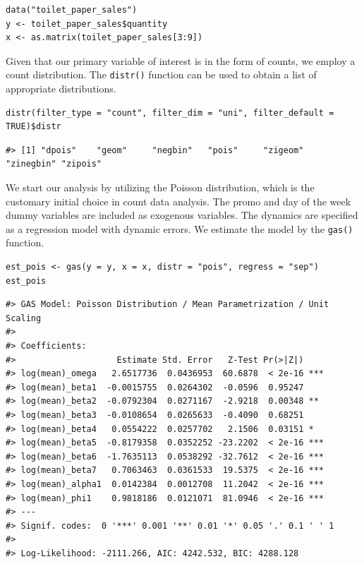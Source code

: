 \begin{verbatim}
data("toilet_paper_sales")
y <- toilet_paper_sales$quantity
x <- as.matrix(toilet_paper_sales[3:9])
\end{verbatim}

Given that our primary variable of interest is in the form of counts, we employ a count distribution. The \texttt{distr()} function can be used to obtain a list of appropriate distributions.

\begin{verbatim}
distr(filter_type = "count", filter_dim = "uni", filter_default = TRUE)$distr
\end{verbatim}

\begin{verbatim}
#> [1] "dpois"    "geom"     "negbin"   "pois"     "zigeom"   "zinegbin" "zipois"
\end{verbatim}

We start our analysis by utilizing the Poisson distribution, which is the customary initial choice in count data analysis. The promo and day of the week dummy variables are included as exogenous variables. The dynamics are specified as a regression model with dynamic errors. We estimate the model by the \texttt{gas()} function.

\begin{verbatim}
est_pois <- gas(y = y, x = x, distr = "pois", regress = "sep")
est_pois
\end{verbatim}

\begin{verbatim}
#> GAS Model: Poisson Distribution / Mean Parametrization / Unit Scaling 
#> 
#> Coefficients: 
#>                    Estimate Std. Error   Z-Test Pr(>|Z|)    
#> log(mean)_omega   2.6517736  0.0436953  60.6878  < 2e-16 ***
#> log(mean)_beta1  -0.0015755  0.0264302  -0.0596  0.95247    
#> log(mean)_beta2  -0.0792304  0.0271167  -2.9218  0.00348 ** 
#> log(mean)_beta3  -0.0108654  0.0265633  -0.4090  0.68251    
#> log(mean)_beta4   0.0554222  0.0257702   2.1506  0.03151 *  
#> log(mean)_beta5  -0.8179358  0.0352252 -23.2202  < 2e-16 ***
#> log(mean)_beta6  -1.7635113  0.0538292 -32.7612  < 2e-16 ***
#> log(mean)_beta7   0.7063463  0.0361533  19.5375  < 2e-16 ***
#> log(mean)_alpha1  0.0142384  0.0012708  11.2042  < 2e-16 ***
#> log(mean)_phi1    0.9818186  0.0121071  81.0946  < 2e-16 ***
#> ---
#> Signif. codes:  0 '***' 0.001 '**' 0.01 '*' 0.05 '.' 0.1 ' ' 1
#> 
#> Log-Likelihood: -2111.266, AIC: 4242.532, BIC: 4288.128
\end{verbatim}

